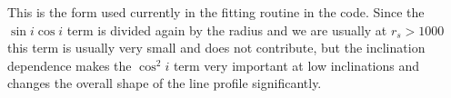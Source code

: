 \documentclass{article}
\begin{document}
This is the form used currently in the fitting routine in the code. Since the $\sin i\cos i$ term is divided again by the radius and we are usually at $r_s > 1000$ this term is usually very small and does not contribute, but the inclination dependence makes the $\cos^2i$ term very important at low inclinations and changes the overall shape of the line profile significantly.
\end{document}
